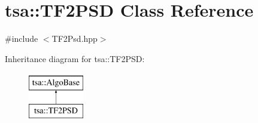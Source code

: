 \hypertarget{classtsa_1_1_t_f2_p_s_d}{}\section{tsa\+:\+:T\+F2\+P\+SD Class Reference}
\label{classtsa_1_1_t_f2_p_s_d}


{\ttfamily \#include $<$T\+F2\+Psd.\+hpp$>$}

Inheritance diagram for tsa\+:\+:T\+F2\+P\+SD\+:\begin{figure}[H]
\begin{center}
\leavevmode
\includegraphics[height=2.000000cm]{classtsa_1_1_t_f2_p_s_d}
\end{center}
\end{figure}
